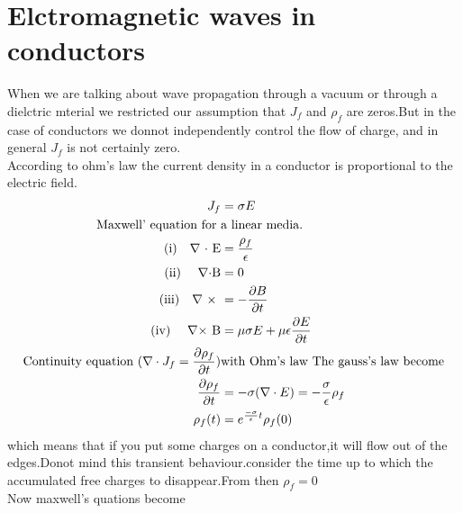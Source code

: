 \section{Elctromagnetic waves in conductors}
When we are talking about wave propagation through a vacuum or through a dielctric mterial we restricted our assumption that $J_f$ and $\rho_f$ are zeros.But in the case of conductors we donnot independently control the flow of charge, and in general $J_f$ is not certainly zero.\\
According to ohm's law the current density in a conductor is proportional to the electric field.
\begin{align*}
J_f&=\sigma E\\
\text{Maxwell' equation for }&\text{a linear media.}\\
\text{(i)\quad $\nabla$ $\cdot$ E}&=\frac{\rho_f}{\epsilon}\\
\text{(ii) \quad $\nabla \cdot $B}&=0\\
\text{(iii)\quad $\nabla$ $\times$ }&=-\frac{\partial B}{\partial t}\\
\text{(iv) \quad $\nabla \times$ B}&=\mu \sigma E+\mu \epsilon \frac{\partial E}{\partial t}\\
\text{Continuity equation ($\nabla \cdot J_f=\frac{\partial \rho_f}{\partial t}$)}& \text{with Ohm's law The gauss's law become}\\
\frac{\partial \rho_f}{\partial t}&=-\sigma (\nabla \cdot E)=-\frac{\sigma}{\epsilon}\rho_f\\
\rho_f(t)&=e^{\frac{-\sigma}{\epsilon}t} \rho_f(0)
\end{align*}
which means that if you put some charges on a conductor,it will flow out of the edges.Donot mind this transient behaviour.consider the time up to which the accumulated free charges to disappear.From then $\rho_f=0$\\
Now maxwell's quations become

